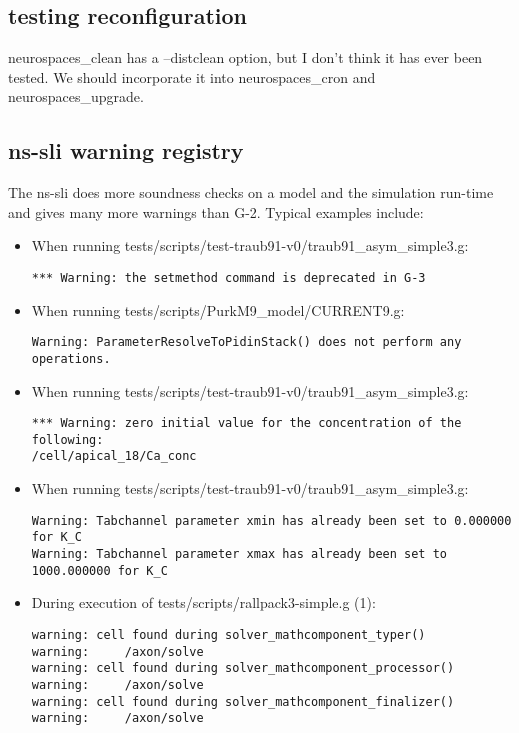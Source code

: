 \documentclass[12pt]{article}
\begin{document}
\subsection{testing reconfiguration}

neurospaces\_clean has a --distclean option, but I don't think it has
ever been tested.  We should incorporate it into neurospaces\_cron and
neurospaces\_upgrade.


\subsection{ns-sli warning registry}

The ns-sli does more soundness checks on a model and the simulation
run-time and gives many more warnings than G-2.  Typical examples
include:

\begin{itemize}
\item When running
  tests/scripts/test-traub91-v0/traub91\_asym\_simple3.g:
\begin{verbatim}
*** Warning: the setmethod command is deprecated in G-3
\end{verbatim}
\item When running tests/scripts/PurkM9\_model/CURRENT9.g:
\begin{verbatim}
Warning: ParameterResolveToPidinStack() does not perform any operations.
\end{verbatim}
\item When running
  tests/scripts/test-traub91-v0/traub91\_asym\_simple3.g:
\begin{verbatim}
*** Warning: zero initial value for the concentration of the following:
/cell/apical_18/Ca_conc
\end{verbatim}
\item When running
  tests/scripts/test-traub91-v0/traub91\_asym\_simple3.g:
  \begin{verbatim}
Warning: Tabchannel parameter xmin has already been set to 0.000000 for K_C
Warning: Tabchannel parameter xmax has already been set to 1000.000000 for K_C
  \end{verbatim}
\item During execution of tests/scripts/rallpack3-simple.g (1):
\begin{verbatim}
warning: cell found during solver_mathcomponent_typer()
warning:     /axon/solve
warning: cell found during solver_mathcomponent_processor()
warning:     /axon/solve
warning: cell found during solver_mathcomponent_finalizer()
warning:     /axon/solve

\end{verbatim}
\end{itemize}
\end{document}
